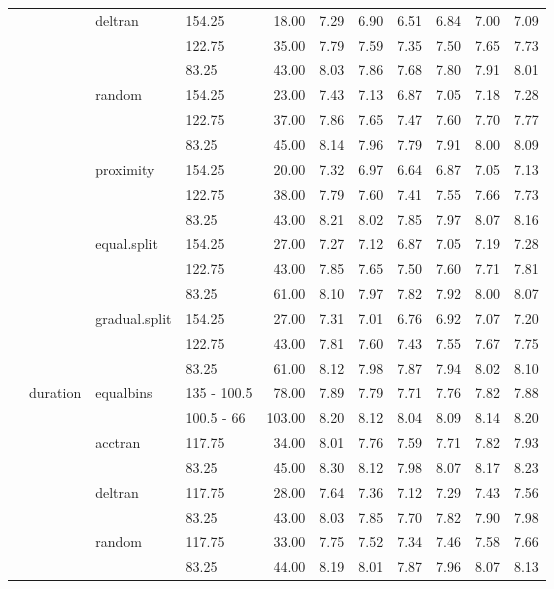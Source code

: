 \begin{longtable}{llllrrrrrrr}
   &  & deltran & 154.25 & 18.00 & 7.29 & 6.90 & 6.51 & 6.84 & 7.00 & 7.09 \\ 
   &  &  & 122.75 & 35.00 & 7.79 & 7.59 & 7.35 & 7.50 & 7.65 & 7.73 \\ 
   &  &  & 83.25 & 43.00 & 8.03 & 7.86 & 7.68 & 7.80 & 7.91 & 8.01 \\ 
   &  & random & 154.25 & 23.00 & 7.43 & 7.13 & 6.87 & 7.05 & 7.18 & 7.28 \\ 
   &  &  & 122.75 & 37.00 & 7.86 & 7.65 & 7.47 & 7.60 & 7.70 & 7.77 \\ 
   &  &  & 83.25 & 45.00 & 8.14 & 7.96 & 7.79 & 7.91 & 8.00 & 8.09 \\ 
   &  & proximity & 154.25 & 20.00 & 7.32 & 6.97 & 6.64 & 6.87 & 7.05 & 7.13 \\ 
   &  &  & 122.75 & 38.00 & 7.79 & 7.60 & 7.41 & 7.55 & 7.66 & 7.73 \\ 
   &  &  & 83.25 & 43.00 & 8.21 & 8.02 & 7.85 & 7.97 & 8.07 & 8.16 \\ 
   &  & equal.split & 154.25 & 27.00 & 7.27 & 7.12 & 6.87 & 7.05 & 7.19 & 7.28 \\ 
   &  &  & 122.75 & 43.00 & 7.85 & 7.65 & 7.50 & 7.60 & 7.71 & 7.81 \\ 
   &  &  & 83.25 & 61.00 & 8.10 & 7.97 & 7.82 & 7.92 & 8.00 & 8.07 \\ 
   &  & gradual.split & 154.25 & 27.00 & 7.31 & 7.01 & 6.76 & 6.92 & 7.07 & 7.20 \\ 
   &  &  & 122.75 & 43.00 & 7.81 & 7.60 & 7.43 & 7.55 & 7.67 & 7.75 \\ 
   &  &  & 83.25 & 61.00 & 8.12 & 7.98 & 7.87 & 7.94 & 8.02 & 8.10 \\ 
   & duration & equalbins & 135 - 100.5 & 78.00 & 7.89 & 7.79 & 7.71 & 7.76 & 7.82 & 7.88 \\ 
   &  &  & 100.5 - 66 & 103.00 & 8.20 & 8.12 & 8.04 & 8.09 & 8.14 & 8.20 \\ 
   &  & acctran & 117.75 & 34.00 & 8.01 & 7.76 & 7.59 & 7.71 & 7.82 & 7.93 \\ 
   &  &  & 83.25 & 45.00 & 8.30 & 8.12 & 7.98 & 8.07 & 8.17 & 8.23 \\ 
   &  & deltran & 117.75 & 28.00 & 7.64 & 7.36 & 7.12 & 7.29 & 7.43 & 7.56 \\ 
   &  &  & 83.25 & 43.00 & 8.03 & 7.85 & 7.70 & 7.82 & 7.90 & 7.98 \\ 
   &  & random & 117.75 & 33.00 & 7.75 & 7.52 & 7.34 & 7.46 & 7.58 & 7.66 \\ 
   &  &  & 83.25 & 44.00 & 8.19 & 8.01 & 7.87 & 7.96 & 8.07 & 8.13 \\ 

\end{longtable}
